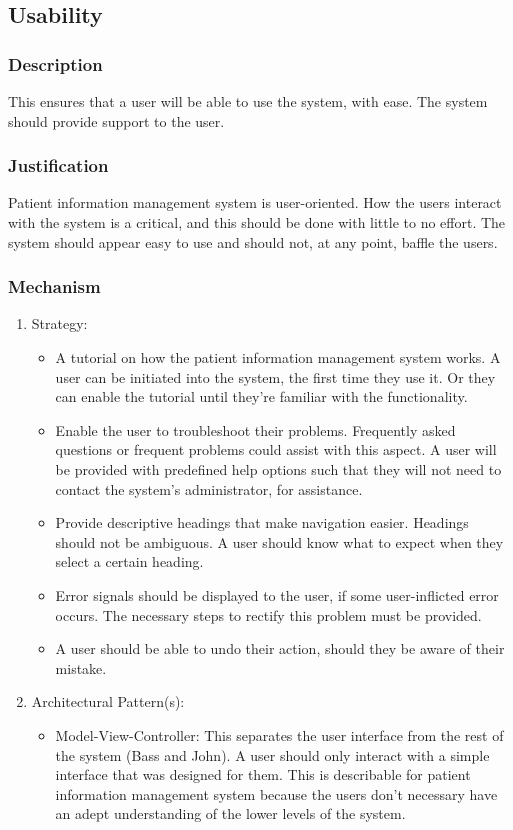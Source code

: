 \subsection{Usability}
\subsubsection{Description}
This ensures that a user will be able to use the system, with ease. The system should provide support to the user.
\subsubsection{Justification}
Patient information management system is user-oriented. How the users interact with the system is a critical, and this should be done with little to no effort. The system should appear easy to use and should not, at any point, baffle the users. 
\subsubsection{Mechanism}
	\begin{enumerate}
		\item Strategy:
		
		 	\begin{itemize}
		 	\item A tutorial on how the patient information management system works. A user can be initiated into the system, the 					  first time they use it. Or they can enable the tutorial until they're familiar with the functionality.
		 	\item Enable the user to troubleshoot their problems. Frequently asked questions or frequent problems could assist 						with this aspect.  A user will be provided with predefined help options such that they will not need to contact 					the system's administrator, for assistance.
		 	\item Provide descriptive headings that make navigation easier. Headings should not be ambiguous. A user should 						  know what to expect when they select a certain heading.
		 	\item Error signals should be displayed to the user, if some user-inflicted error occurs. The necessary steps to 		                  rectify this problem must be provided.
		 	\item A user should be able to undo their action, should they be aware of their mistake.
		 	\end{itemize}
		 	
		\item Architectural Pattern(s):
		
			\begin{itemize}
			\item Model-View-Controller: This separates the user interface from the rest of the system (Bass and John). A user 		                  should only interact with a simple interface that was designed for them. This is describable for patient         					information management system because the users don't necessary have an adept understanding of the lower     		                levels of the system.
			\end{itemize}
	\end{enumerate}
